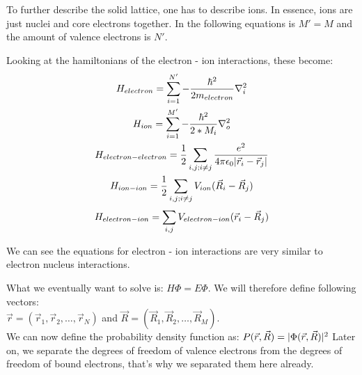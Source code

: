 \documentclass{report}
\begin{document}

To further describe the solid lattice, one has to describe ions. In essence, ions are just nuclei and core electrons together. In the following equations is $ M' = M $ and the amount of valence electrons is $ N' $.\\ \par
Looking at the hamiltonians of the electron - ion interactions, these become:
\begin{gather}
	H_{electron} = \sum_{i = 1}^{N'}{-\frac{\hbar^2}{2m_{electron}} \nabla_i^2}\\
	H_{ion} = \sum_{i = 1}^{M'}{-\frac{\hbar^2}{2*M_i} \nabla_o^2}\\
	H_{electron - electron} = \frac{1}{2} \sum_{i, j; i \neq j}^{}{\frac{e^2}{4 \pi \epsilon_0 \lvert\vec{r}_i - \vec{r}_j\rvert}}\\
	H_{ion - ion} = \frac{1}{2} \sum_{i, j; i \neq j}^{}{V_{ion}(\vec{R}_i - \vec{R}_j)}\\
	H_{electron - ion} = \sum_{i, j}^{}{V_{electron - ion}(\vec{r}_i - \vec{R}_j)}
\end{gather} \par
We can see the equations for electron - ion interactions are very similar to electron nucleus interactions. \\ \par

What we eventually want to solve is: $ H\Phi = E\Phi $. We will therefore define following vectors: \\$\vec{r} = (\vec{r}_1, \vec{r}_2, \dots, \vec{r}_N)$ and $\vec{R} = (\vec{R}_1, \vec{R}_2, \dots, \vec{R}_M)$. \\
We can now define the probability density function as: $P (\vec{r}, \vec{R}) = \lvert\Phi(\vec{r}, \vec{R})\rvert^2$
Later on, we separate the degrees of freedom of valence electrons from the degrees of freedom of bound electrons, that's why we separated them here already.
\end{document}

